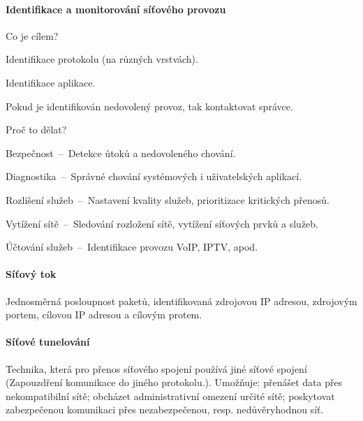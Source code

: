 \paragraph*{Identifikace a monitorování síťového provozu} \begin{compactitem}
    \item Co je cílem? \begin{compactitem}
        \item Identifikace protokolu (na různých vrstvách).
        \item Identifikace aplikace.
        \item Pokud je identifikován nedovolený provoz, tak kontaktovat správce.
    \end{compactitem}
    \item Proč to dělat? \begin{compactitem}
        \item Bezpečnost~--~Detekce útoků a nedovoleného chování.
        \item Diagnostika~--~Správné chování systémových i uživatelských aplikací.
        \item Rozlišení služeb~--~Nastavení kvality služeb, prioritizace kritických přenosů.
        \item Vytížení sítě~--~Sledování rozložení sítě, vytížení síťových prvků a služeb.
        \item Účtování služeb~--~Identifikace provozu VoIP, IPTV, apod.
    \end{compactitem}
\end{compactitem}

\paragraph*{Síťový tok} Jednosměrná posloupnost paketů, identifikovaná zdrojovou IP adresou, zdrojovým portem, cílovou IP adresou a cílovým protem.

\paragraph*{Síťové tunelování} Technika, která pro přenos síťového spojení používá jiné síťové spojení (Zapouzdření komunikace do jiného protokolu.). Umožňuje: přenášet data přes nekompatibilní sítě; obcházet administrativní omezení určité sítě; poskytovat zabezpečenou komunikaci přes nezabezpečenou, resp. nedůvěryhodnou síť.


